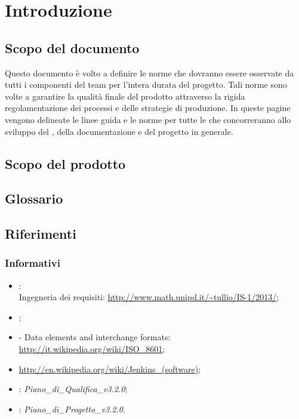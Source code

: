 \newpage
\section{Introduzione}%
\label{1.0}
\subsection{Scopo del documento}%
\label{1.1}
Questo documento è volto a definire le norme che dovranno essere osservate da tutti i componenti del team per l'intera durata del progetto. Tali norme sono volte a garantire la qualità finale del prodotto attraverso la rigida regolamentazione dei processi e delle strategie di produzione. In queste pagine vengono delineate le linee guida e le norme per tutte le  che concorreranno allo sviluppo del , della documentazione e del progetto in generale.

\subsection{Scopo del prodotto}
\label{1.2}
\Prodotto{}

\subsection{Glossario}%
\label{1.3}
\Glossario{}

\subsection{Riferimenti} %
\label{1.4}
\subsubsection{Informativi}
\begin{itemize}
\item {}:\\
Ingegneria dei requisiti: \url{http://www.math.unipd.it/~tullio/IS-1/2013/};
\item {};\\
\item {} - Data elements and interchange formats: \url{http://it.wikipedia.org/wiki/ISO\_8601};
\item {} \url{http://en.wikipedia.org/wiki/Jenkins_(software)};
\item {}: \emph{Piano\_di\_Qualifica\_v3.2.0};
\item {}: \emph{Piano\_di\_Progetto\_v3.2.0}.
\end{itemize}

